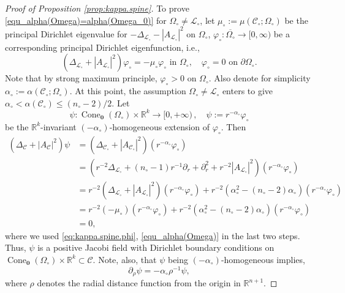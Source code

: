 \documentclass[11pt, letterpaper, reqno]{amsart}
\numberwithin{equation}{section}
\theoremstyle{remark}
\newcommand{\RR}{\mathbb{R}}
\newcommand{\cC}{\mathcal{C}}
\newcommand{\cL}{\mathcal{L}}
\newcommand{\orig}{\mathbf{0}}
\begin{document}
\begin{proof}[Proof of Proposition \ref{prop:kappa.spine}]
    To prove \eqref{equ_alpha(Omega)=alpha(Omega_0)} for $\Omega
    _\circ \neq \cL_\circ$, let $\mu_\circ:= \mu(\cC_\circ; \Omega_\circ)$ be the principal Dirichlet eigenvalue for $-\Delta_{\cL_\circ} - |A_{\cL_\circ}|^2$ on $\Omega_\circ$, $\varphi_\circ : \overline{\Omega_\circ} \to [0, \infty)$ be a corresponding principal Dirichlet eigenfunction, i.e.,
	\begin{equation} \label{eq:kappa.spine.phi}
		(\Delta_{\cL_\circ} + |A_{\cL_\circ}|^2) \varphi_\circ = -\mu_{\circ} \varphi_\circ \text{ in } \Omega_\circ, \quad \varphi_\circ = 0 \text{ on } \partial \Omega_\circ.
	\end{equation}
    Note that by strong maximum principle, $\varphi_\circ>0$ on $\Omega_\circ$. Also denote for simplicity $\alpha_\circ:= \alpha(\cC_\circ; \Omega_\circ)$. At this point, the assumption $\Omega_\circ\neq \cL_\circ$ enters to give $\alpha_\circ< \alpha(\cC_\circ)\leq (n_\circ-2)/2$. Let \[
      \psi: \operatorname{Cone}_\orig(\Omega_\circ)\times \RR^k \to [0, +\infty)\,, \quad \psi := r^{-\alpha_\circ}\varphi_\circ
    \] 
    be the $\RR^k$-invariant $(-\alpha_\circ)$-homogeneous extension of $\varphi_\circ$. Then 
	\begin{align*}
		 (\Delta_\cC + |A_\cC|^2)\psi 
        & = (\Delta_{\cC_\circ} + |A_{\cC_\circ}|^2) (r^{-\alpha_\circ} \varphi_\circ) \\
		& = (r^{-2} \Delta_{\cL_\circ} + (n_\circ-1) r^{-1} \partial_r + \partial_r^2 + r^{-2} |A_{\cL_\circ}|^2)(r^{-\alpha_\circ} \varphi_\circ) \\
		& = r^{-2} (\Delta_{\cL_\circ} + |A_{\cL_\circ}|^2) (r^{-\alpha_\circ} \varphi_\circ) + r^{-2} (\alpha_\circ^2 - (n_\circ-2) \alpha_\circ) (r^{-\alpha_\circ} \varphi_\circ) \\
		& = r^{-2} (-\mu_\circ) (r^{-\alpha_\circ} \varphi_\circ) + r^{-2} (\alpha_\circ^2 - (n_\circ-2) \alpha_\circ) (r^{-\alpha_{\circ}} \varphi_\circ) \\
		& = 0,
	\end{align*}
	where we used \eqref{eq:kappa.spine.phi}, \eqref{equ_alpha(Omega)} in the last two steps. Thus, $\psi$ is a positive Jacobi field with Dirichlet boundary conditions on $\operatorname{Cone}_\orig(\Omega_\circ) \times \RR^k \subset \cC$. Note, also, that $\psi$ being $(-\alpha_{\circ})$-homogeneous implies,
	\begin{equation} \label{eq:kappa.spine.homogeneous}
		\partial_\rho \psi = - \alpha_{\circ}\rho^{-1} \psi,
	\end{equation}
	where $\rho$ denotes the radial distance function from the origin in $\RR^{n+1}$. 
	

\end{proof}
\end{document}
